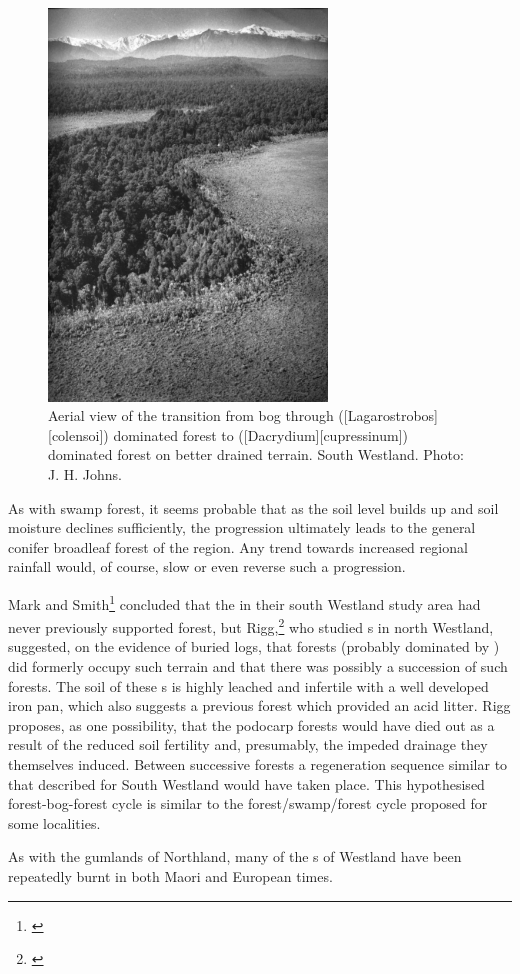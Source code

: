 \begin{figure}
	\includegraphics[width=0.66\textwidth]{graphics/fig_068}
	\centering
	\caption[Aerial view of the transition from pakihi bog through silver pine to rimu]{Aerial view of the transition from  bog through  ([Lagarostrobos][colensoi]) dominated forest to  ([Dacrydium][cupressinum]) dominated forest on better drained terrain.
South Westland.
	Photo: J. H. Johns.}%
	\label{fig:68transition}
\end{figure}

As with  swamp forest, it seems probable that as the soil level builds up and soil moisture declines sufficiently, the progression ultimately leads to the general conifer broadleaf forest of the region.
Any trend towards increased regional rainfall would, of course, slow or even reverse such a progression.

Mark and Smith\footnote{\cite{mark1975lowland}} concluded that the  in their south Westland study area had never previously supported forest, but Rigg,\footnote{\cite{rigg1962pakihi}} who studied s in north Westland, suggested, on the evidence of buried logs, that forests (probably dominated by ) did formerly occupy such terrain and that there was possibly a succession of such forests.
The soil of these s is highly leached and infertile with a well developed iron pan, which also suggests a previous forest which provided an acid litter.
Rigg proposes, as one possibility, that the podocarp forests would have died out as a result of the reduced soil fertility and, presumably, the impeded drainage they themselves induced.
Between successive forests a regeneration sequence similar to that described for South Westland would have taken place.
This hypothesised forest-bog-forest cycle is similar to the forest/swamp/forest cycle proposed for some  localities.

As with the gumlands of Northland, many of the s of Westland have been repeatedly burnt in both Maori and European times.
